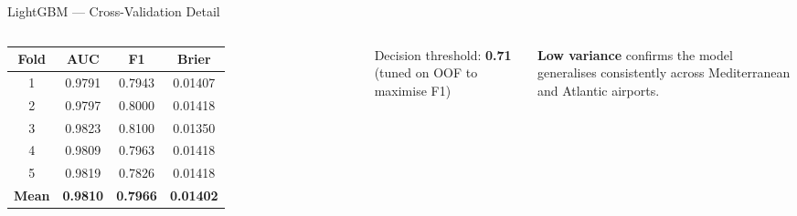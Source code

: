 \documentclass[aspectratio=169,10pt]{beamer}
\begin{document}
\begin{frame}{LightGBM --- Cross-Validation Detail}
  \begin{columns}[T]
      \begin{table}
        \small\setlength{\tabcolsep}{4pt}
        \begin{tabular}{cccc}
          \toprule
          \rowcolor{navy}
          \color{white}\textbf{Fold} &
          \color{white}\textbf{AUC} &
          \color{white}\textbf{F1} &
          \color{white}\textbf{Brier}\\
          \midrule
          1 & 0.9791 & 0.7943 & 0.01407\\
          2 & 0.9797 & 0.8000 & 0.01418\\
          3 & 0.9823 & 0.8100 & 0.01350\\
          4 & 0.9809 & 0.7963 & 0.01418\\
          5 & 0.9819 & 0.7826 & 0.01418\\
          \midrule
          \rowcolor{ltgreen!25}
          \textbf{Mean} &
          \textbf{0.9810} & \textbf{0.7966} & \textbf{0.01402}\\
          \bottomrule
        \end{tabular}
      \end{table}
      \vspace{4pt}
      {\footnotesize Decision threshold: \textbf{0.71}
       (tuned on OOF to maximise F1)}
      \vspace{2pt}
      \begin{block}{}
        \footnotesize
        \textbf{Low variance} confirms the model generalises
        consistently across Mediterranean and Atlantic airports.
      \end{block}
  \end{columns}
\end{frame}
\end{document}
